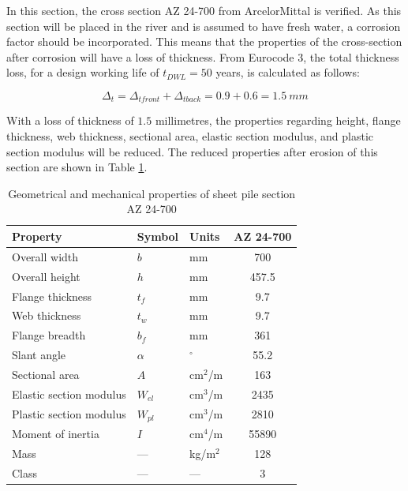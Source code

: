 In this section, the cross section AZ 24-700 from ArcelorMittal is verified. As this section will be placed in the river and is assumed to have fresh water, a corrosion factor should be incorporated. This means that the properties of the cross-section after corrosion will have a loss of thickness. From Eurocode 3, the total thickness loss, for a design working life of $t_{DWL} = 50$ years, is calculated as follows:

\begin{equation}
    \Delta_{t} = \Delta_{tfront} +  \Delta_{tback} = 0.9 + 0.6= 1.5 \ mm 
\end{equation}

With a loss of thickness of $1.5$ millimetres, the properties regarding height, flange thickness, web thickness, sectional area, elastic section modulus, and plastic section modulus will be reduced. The reduced properties after erosion of this section are shown in Table \ref{tab:pu32}.


\begin{table}[H]
  \centering
  \small
  \setlength{\tabcolsep}{6pt}
  \renewcommand{\arraystretch}{1.15}
  \caption{Geometrical and mechanical properties of sheet pile section AZ 24-700}
  \label{tab:pu32}
  \begin{tabular}{@{}l l l c@{}}
    \toprule
    Property & Symbol & Units & AZ 24-700 \\
    \midrule
    Overall width                & $b$     & mm     & 700   \\
    Overall height               & $h$     & mm     & 457.5   \\
    Flange thickness             & $t_f$   & mm     & 9.7  \\
    Web thickness                & $t_w$   & mm     & 9.7  \\
    Flange breadth               & $b_f$   & mm     & 361   \\
    Slant angle                  & $\alpha$ & $^\circ$ & 55.2 \\
    Sectional area               & $A$     & cm$^2$/m & 163 \\
    Elastic section modulus      & $W_{el}$ & cm$^3$/m & 2435 \\
    Plastic section modulus      & $W_{pl}$ & cm$^3$/m & 2810 \\
    Moment of inertia            & $I$     & cm$^4$/m & 55890 \\
    Mass                         & ---     & kg/m$^2$ & 128 \\
    Class    & ---     & ---     & 3 \\
    \bottomrule
  \end{tabular}
\end{table}

